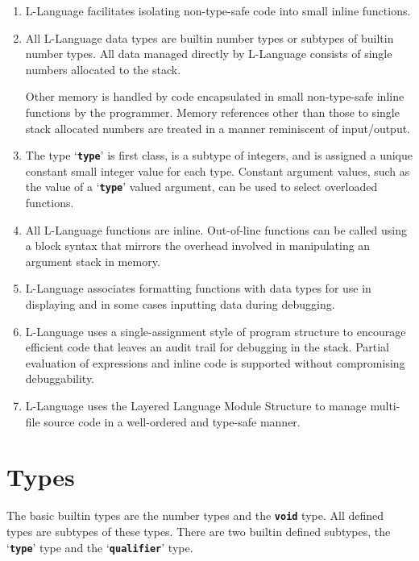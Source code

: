 \documentclass[12pt]{article}
\newcommand{\TT}[1]{{\tt \bfseries #1}}
\begin{document}
\begin{enumerate}

\item
L-Language facilitates isolating non-type-safe code into small inline functions.

\item
All L-Language data types are builtin number types or subtypes of
builtin number types.  All data managed directly by L-Language consists
of single numbers allocated to the stack.

Other memory is handled by code
encapsulated in small non-type-safe inline functions by the programmer.
Memory references other than those to single stack allocated numbers
are treated in a manner reminiscent of input/output.

\item
The type `\TT{type}' is first class, is a subtype of integers, and
is assigned a unique constant small integer value for each type.  Constant
argument values, such as the value of a `\TT{type}' valued
argument, can be used to select overloaded functions.

\item
All L-Language functions are inline.  Out-of-line functions can be
called using a block syntax that mirrors the overhead involved in
manipulating an argument stack in memory.

\item
L-Language associates formatting functions
with data types for use in displaying and in some cases inputting
data during debugging.

\item
L-Language uses a single-assignment style of program structure
to encourage
efficient code that leaves an audit trail for debugging in the stack.
Partial evaluation of expressions and inline code is supported without
compromising debuggability.

\item
L-Language uses the Layered Language Module Structure to manage
multi-file source code in a well-ordered and type-safe manner.


\end{enumerate}


\section{Types}
\label{TYPES}

The basic builtin types are the number types and the \TT{void} type.
All defined types are subtypes of these types.
There are two builtin defined subtypes, the `\TT{type}' type and
the `\TT{qualifier}' type.
\end{document}
